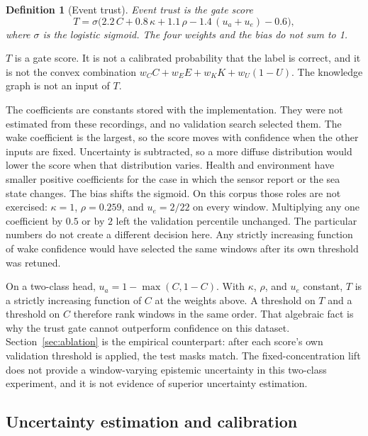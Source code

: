 \documentclass[sn-mathphys-num]{sn-jnl}%
\theoremstyle{thmstyleone}%
\theoremstyle{thmstyletwo}%
\theoremstyle{thmstylethree}%
\newtheorem{definition}{Definition}%
\begin{document}
\begin{definition}[Event trust]
Event trust is the gate score
\begin{equation}
T = \sigma\bigl(2.2\,C + 0.8\,\kappa + 1.1\,\rho - 1.4\,(u_a + u_e) - 0.6\bigr),
\label{eq:trust}
\end{equation}
where $\sigma$ is the logistic sigmoid. The four weights and the bias do not sum to 1.
\end{definition}

$T$ is a gate score. It is not a calibrated probability that the label is correct, and it is not the convex combination $w_C C + w_E E + w_K K + w_U(1-U)$. The knowledge graph is not an input of $T$.

The coefficients are constants stored with the implementation. They were not estimated from these recordings, and no validation search selected them. The wake coefficient is the largest, so the score moves with confidence when the other inputs are fixed. Uncertainty is subtracted, so a more diffuse distribution would lower the score when that distribution varies. Health and environment have smaller positive coefficients for the case in which the sensor report or the sea state changes. The bias shifts the sigmoid. On this corpus those roles are not exercised: $\kappa = 1$, $\rho = 0.259$, and $u_e = 2/22$ on every window. Multiplying any one coefficient by $0.5$ or by $2$ left the validation percentile unchanged. The particular numbers do not create a different decision here. Any strictly increasing function of wake confidence would have selected the same windows after its own threshold was retuned.

On a two-class head, $u_a = 1 - \max(C, 1-C)$. With $\kappa$, $\rho$, and $u_e$ constant, $T$ is a strictly increasing function of $C$ at the weights above. A threshold on $T$ and a threshold on $C$ therefore rank windows in the same order. That algebraic fact is why the trust gate cannot outperform confidence on this dataset. Section~\ref{sec:ablation} is the empirical counterpart: after each score's own validation threshold is applied, the test masks match. The fixed-concentration lift does not provide a window-varying epistemic uncertainty in this two-class experiment, and it is not evidence of superior uncertainty estimation.

\subsection{Uncertainty estimation and calibration}\label{sec:calibration-method}
\end{document}
